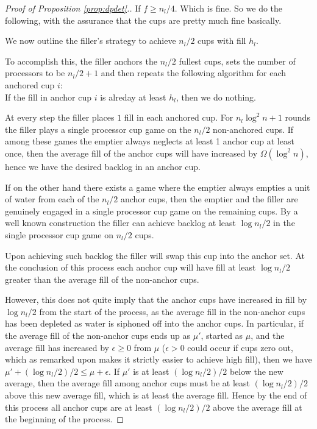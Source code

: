 \documentclass{article}[11pt]
\begin{document}
\begin{proof}[Proof of Proposition \ref{prop:dpdet}.]
  If $f \ge n_l/4$. Which is fine. So we do the following, with the assurance that the cups
  are pretty much fine basically.

  We now outline the filler's strategy to achieve $n_l/2$ cups with fill $h_l$. 

  To accomplish this, the filler anchors the $n_l/2$ fullest cups, sets the number of
  processors to be $n_l/2+1$ and then repeats the following algorithm for each
  anchored cup $i$: \\
  If the fill in anchor cup $i$ is alreday at least $h_l$, then we do nothing.

  At every step the filler places $1$ fill in each anchored cup. For $n_l\log^2 n
  + 1$ rounds the filler plays a single processor cup game on the $n_l/2$
  non-anchored cups. If among these games the emptier always neglects at least
  1 anchor cup at least once, then the average fill of the anchor cups will
  have increased by $\Omega(\log^2 n)$, hence we have the desired backlog in an
  anchor cup. 

  If on the other hand there exists a game where the emptier always empties a
  unit of water from each of the $n_l/2$ anchor cups, then the emptier and the
  filler are genuinely engaged in a single processor cup game on the remaining
  cups. By a well known construction the filler can achieve backlog at least
  $\log n_l/2$ in the single processor cup game on $n_l/2$ cups. 

  Upon achieving such backlog the filler will swap this cup into the anchor
  set. At the conclusion of this process each anchor cup will have fill at
  least $\log n_l/2$ greater than the average fill of the non-anchor cups.

  However, this does not quite imply that the anchor cups have increased in
  fill by $\log n_l/2$ from the start of the process, as the average fill in the
  non-anchor cups has been depleted as water is siphoned off into the anchor
  cups. In particular, if the average fill of the non-anchor cups ends up as
  $\mu'$, started as $\mu$, and the average fill has increased by $\epsilon \ge
  0$ from $\mu$ ($\epsilon >0$ could occur if cups zero out, which as remarked
  upon makes it strictly easier to achieve high fill), then we have $\mu' +
  (\log n_l/2)/ 2 \le \mu +\epsilon$. If $\mu'$ is at least $(\log n_l/2 )/2$ below
  the new average, then the average fill among anchor cups must be at least
  $(\log n_l/2)/2$ above this new average fill, which is at least the average
  fill. Hence by the end of this process all anchor cups are at least $(\log
  n_l/2)/2$ above the average fill at the beginning of the process.


\end{proof}
\end{document}
